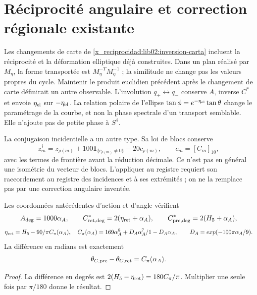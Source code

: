 \section{Réciprocité angulaire et correction régionale existante}
\label{x_reciprocidad:lib02:correccion-regional}

Les changements de carte de \cref{x_reciprocidad:lib02:inversion-carta} incluent la réciprocité et la déformation elliptique déjà construites. Dans un plan réalisé par \(M_\eta\), la forme transportée est \(M_\eta^{-T}M_\eta^{-1}\) ; la similitude ne change pas les valeurs propres du cycle. Maintenir le produit euclidien précédent après le changement de carte définirait un autre observable. L'involution \(q_+\leftrightarrow q_-\) conserve \(A\), inverse \(C^*\) et envoie \(\eta_{\rm el}\) sur \(-\eta_{\rm el}\). La relation polaire de l'ellipse \(\tan\phi=e^{-\eta_{\rm el}}\tan\theta\) change le paramétrage de la courbe, et non la phase spectrale d'un transport semblable. Elle n'ajoute pas de petite phase à \(S^4\).

La conjugaison incidentielle a un autre type. Sa loi de blocs conserve
\[
 z_m^\dagger=z_{\rho(m)}
 +100\mathbf1_{\{c_{\rho(m)}\ne0\}}-20c_{\rho(m)},
 \qquad c_m=[C_m]_{10},
\]
avec les termes de frontière avant la réduction décimale. Ce n’est pas en
général une isométrie du vecteur de blocs. L’appliquer au registre
requiert son raccordement au registre des incidences et à ses extrémités ; on ne la
remplace pas par une correction angulaire inventée.

\begin{proposition}
\label{x_reciprocidad:lib02:retorno-regional}
Les coordonnées antécédentes d’action et d’angle vérifient
\[
 A_{\rm deg}=1000\alpha_A,\qquad
 C^*_{\rm ret,deg}=2(\eta_{\rm ret}+\alpha_A),\qquad
 C^*_{\rm pre,deg}=2(H_5+\alpha_A),
\]
\[
 \eta_{\rm ret}=H_5-\frac{90}{\pi}\mathcal C_\pi(\alpha_A),
 \quad
 \mathcal C_\pi(\alpha_A)=169\alpha_A^6+
 \frac{D_A\alpha_A^7}{1-D_A\alpha_A},\qquad
 D_A=\exp(-100\pi\alpha_A/9).
\]
La différence en radians est exactement
\[
 \theta_{C,\rm pre}-\theta_{C,\rm ret}=\mathcal C_\pi(\alpha_A).
\]
\end{proposition}
\begin{proof}
La différence en degrés est \(2(H_5-\eta_{\rm ret})=180\mathcal C_\pi/\pi\). Multiplier une seule fois par \(\pi/180\) donne le résultat.
\end{proof}

